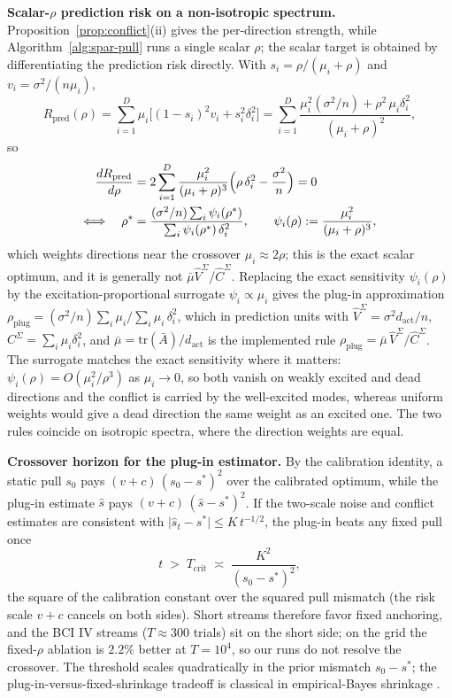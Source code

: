 \medskip
\noindent\textbf{Scalar-$\rho$ prediction risk on a non-isotropic spectrum.}
Proposition~\ref{prop:conflict}(ii) gives the per-direction strength, while Algorithm~\ref{alg:spar-pull} runs a single scalar $\rho$; the scalar target is obtained by differentiating the prediction risk directly.
With $s_i = \rho/(\mu_i+\rho)$ and $v_i = \sigma^2/(n\mu_i)$,
\[
  R_{\mathrm{pred}}(\rho)
  = \sum_{i=1}^D \mu_i\bigl[(1-s_i)^2 v_i + s_i^2\delta_i^2\bigr]
  = \sum_{i=1}^D \frac{\mu_i^2(\sigma^2/n) + \rho^2\,\mu_i\delta_i^2}{(\mu_i+\rho)^2},
\]
so
\[
\begin{aligned}
  \frac{d R_{\mathrm{pred}}}{d\rho}
  &= 2\sum_{i=1}^D \frac{\mu_i^2}{(\mu_i+\rho)^3}
    \Bigl(\rho\,\delta_i^2 - \frac{\sigma^2}{n}\Bigr) = 0 \\
  \Longleftrightarrow\quad
  \rho^* &= \frac{(\sigma^2/n)\sum_i \psi_i(\rho^*)}{\sum_i \psi_i(\rho^*)\,\delta_i^2},
  \qquad
  \psi_i(\rho) := \frac{\mu_i^2}{(\mu_i+\rho)^3},
\end{aligned}
\]
which weights directions near the crossover $\mu_i \approx 2\rho$; this is the exact scalar optimum, and it is generally not $\bar\mu\widehat V^\Sigma/\widehat C^\Sigma$.
Replacing the exact sensitivity $\psi_i(\rho)$ by the excitation-proportional surrogate $\psi_i \propto \mu_i$ gives the plug-in approximation
$\rho_{\mathrm{plug}} = (\sigma^2/n)\sum_i \mu_i \big/ \sum_i \mu_i\,\delta_i^2$, which in prediction units with $\widehat V^\Sigma = \sigma^2 d_{\mathrm{act}}/n$, $C^\Sigma = \sum_i \mu_i\delta_i^2$, and $\bar\mu = \mathrm{tr}(\bar A)/d_{\mathrm{act}}$ is the implemented rule $\rho_{\mathrm{plug}} = \bar\mu\,\widehat V^\Sigma/\widehat C^\Sigma$.
The surrogate matches the exact sensitivity where it matters: $\psi_i(\rho) = O(\mu_i^2/\rho^3)$ as $\mu_i \to 0$, so both vanish on weakly excited and dead directions and the conflict is carried by the well-excited modes, whereas uniform weights would give a dead direction the same weight as an excited one.
The two rules coincide on isotropic spectra, where the direction weights are equal.

\medskip
\noindent\textbf{Crossover horizon for the plug-in estimator.}
By the calibration identity, a static pull $s_0$ pays $(v + c)\,(s_0 - s^*)^2$ over the calibrated optimum, while the plug-in estimate $\hat s$ pays $(v + c)\,(\hat s - s^*)^2$.
If the two-scale noise and conflict estimates are consistent with $\lvert\hat s_t - s^*\rvert \le K\,t^{-1/2}$, the plug-in beats any fixed pull once
\[
  t \;>\; T_{\mathrm{crit}} \;\asymp\; \frac{K^2}{(s_0 - s^*)^2},
\]
the square of the calibration constant over the squared pull mismatch (the risk scale $v+c$ cancels on both sides).
Short streams therefore favor fixed anchoring, and the BCI IV streams ($T \approx 300$ trials) sit on the short side; on the grid the fixed-$\rho$ ablation is $2.2\%$ better at $T = 10^4$, so our runs do not resolve the crossover. The threshold scales quadratically in the prior mismatch $s_0 - s^*$; the plug-in-versus-fixed-shrinkage tradeoff is classical in empirical-Bayes shrinkage \citep{ledoitwolf2004}.

